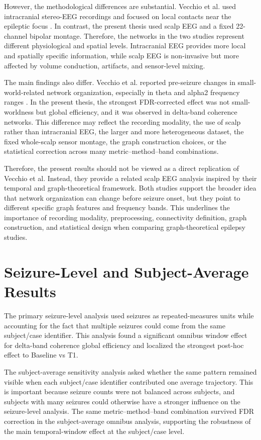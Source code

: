 However, the methodological differences are substantial. Vecchio et al. used
intracranial stereo-EEG recordings and focused on local contacts near the
epileptic focus \cite{Vecchio2016}. In contrast, the present thesis used scalp
EEG and a fixed \num{22}-channel bipolar montage. Therefore, the networks in
the two studies represent different physiological and spatial levels.
Intracranial EEG provides more local and spatially specific information, while
scalp EEG is non-invasive but more affected by volume conduction, artifacts, and
sensor-level mixing.

The main findings also differ. Vecchio et al. reported pre-seizure changes in
small-world-related network organization, especially in theta and alpha2
frequency ranges \cite{Vecchio2016}. In the present thesis, the strongest
FDR-corrected effect was not small-worldness but global efficiency, and it was
observed in delta-band coherence networks. This difference may reflect the
recording modality, the use of scalp rather than intracranial EEG, the larger
and more heterogeneous dataset, the fixed whole-scalp sensor montage, the graph
construction choices, or the statistical correction across many
metric--method--band combinations.

Therefore, the present results should not be viewed as a direct replication of
Vecchio et al. Instead, they provide a related scalp EEG analysis inspired by
their temporal and graph-theoretical framework. Both studies support the
broader idea that network organization can change before seizure onset, but
they point to different specific graph features and frequency bands. This
underlines the importance of recording modality, preprocessing, connectivity
definition, graph construction, and statistical design when comparing
graph-theoretical epilepsy studies.

\section{Seizure-Level and Subject-Average Results}
\label{sec:discussion-seizure-subject-average}

The primary seizure-level analysis used seizures as repeated-measures units
while accounting for the fact that multiple seizures could come from the same
subject/case identifier. This analysis found a significant omnibus window
effect for delta-band coherence global efficiency and localized the strongest
post-hoc effect to Baseline vs T1.

The subject-average sensitivity analysis asked whether the same pattern remained
visible when each subject/case identifier contributed one average trajectory.
This is important because seizure counts were not balanced across subjects, and
subjects with many seizures could otherwise have a stronger influence on the
seizure-level analysis. The same metric--method--band combination survived FDR
correction in the subject-average omnibus analysis, supporting the robustness of
the main temporal-window effect at the subject/case level.

